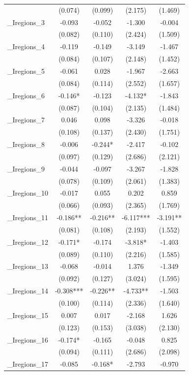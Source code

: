\documentclass[]{article}
\begin{document}
\begin{tabular}{lcccc}
 & (0.074) & (0.099) & (2.175) & (1.469) \\
\_Iregions\_3 & -0.093 & -0.052 & -1.300 & -0.004 \\
 & (0.082) & (0.110) & (2.424) & (1.509) \\
\_Iregions\_4 & -0.119 & -0.149 & -3.149 & -1.467 \\
 & (0.084) & (0.107) & (2.148) & (1.452) \\
\_Iregions\_5 & -0.061 & 0.028 & -1.967 & -2.663 \\
 & (0.084) & (0.114) & (2.552) & (1.657) \\
\_Iregions\_6 & -0.146* & -0.123 & -4.132* & -1.843 \\
 & (0.087) & (0.104) & (2.135) & (1.484) \\
\_Iregions\_7 & 0.046 & 0.098 & -3.326 & -0.018 \\
 & (0.108) & (0.137) & (2.430) & (1.751) \\
\_Iregions\_8 & -0.006 & -0.244* & -2.417 & -0.102 \\
 & (0.097) & (0.129) & (2.686) & (2.121) \\
\_Iregions\_9 & -0.044 & -0.097 & -3.267 & -1.828 \\
 & (0.078) & (0.109) & (2.061) & (1.383) \\
\_Iregions\_10 & -0.017 & 0.055 & 0.202 & 0.859 \\
 & (0.066) & (0.093) & (2.365) & (1.769) \\
\_Iregions\_11 & -0.186** & -0.216** & -6.117*** & -3.191** \\
 & (0.081) & (0.108) & (2.193) & (1.552) \\
\_Iregions\_12 & -0.171* & -0.174 & -3.818* & -1.403 \\
 & (0.089) & (0.110) & (2.216) & (1.585) \\
\_Iregions\_13 & -0.068 & -0.014 & 1.376 & -1.349 \\
 & (0.092) & (0.127) & (3.024) & (1.595) \\
\_Iregions\_14 & -0.308*** & -0.226** & -4.733** & -1.503 \\
 & (0.100) & (0.114) & (2.336) & (1.640) \\
\_Iregions\_15 & 0.007 & 0.017 & -2.168 & 1.626 \\
 & (0.123) & (0.153) & (3.038) & (2.130) \\
\_Iregions\_16 & -0.174* & -0.165 & -0.048 & 0.825 \\
 & (0.094) & (0.111) & (2.686) & (2.098) \\
\_Iregions\_17 & -0.085 & -0.168* & -2.793 & -0.970 \\

\end{tabular}
\end{document}
